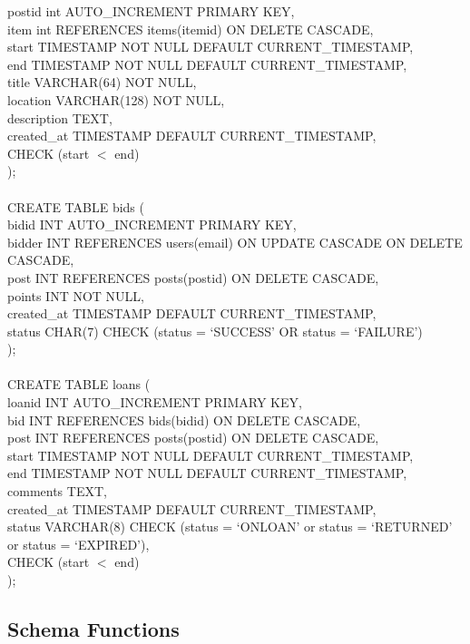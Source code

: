 postid int AUTO\_INCREMENT PRIMARY KEY,\\
item int REFERENCES items(itemid) ON DELETE CASCADE,\\
start TIMESTAMP NOT NULL DEFAULT CURRENT\_TIMESTAMP,\\
end TIMESTAMP NOT NULL DEFAULT CURRENT\_TIMESTAMP, \\
title VARCHAR(64) NOT NULL,\\
location VARCHAR(128) NOT NULL,\\
description TEXT,\\
created\_at TIMESTAMP DEFAULT CURRENT\_TIMESTAMP,\\
CHECK (start $<$ end)\\
);\\\\
CREATE TABLE bids (\\
bidid INT AUTO\_INCREMENT PRIMARY KEY,\\
bidder INT REFERENCES users(email) ON UPDATE CASCADE ON DELETE CASCADE,\\
post INT REFERENCES posts(postid) ON DELETE CASCADE,\\
points INT NOT NULL,\\
created\_at TIMESTAMP DEFAULT CURRENT\_TIMESTAMP,\\
status CHAR(7) CHECK (status = `SUCCESS' OR status = `FAILURE')\\
);\\\\
CREATE TABLE loans (\\
loanid INT AUTO\_INCREMENT PRIMARY KEY,\\
bid INT REFERENCES bids(bidid) ON DELETE CASCADE,\\
post INT REFERENCES posts(postid) ON DELETE CASCADE,\\
start TIMESTAMP NOT NULL DEFAULT CURRENT\_TIMESTAMP,\\
end TIMESTAMP NOT NULL DEFAULT CURRENT\_TIMESTAMP,\\
comments TEXT,\\
created\_at TIMESTAMP DEFAULT CURRENT\_TIMESTAMP,\\
status VARCHAR(8) CHECK (status = `ONLOAN' or status = `RETURNED' or status = `EXPIRED'),\\
CHECK (start $<$ end)\\
);

\subsection{Schema Functions}

